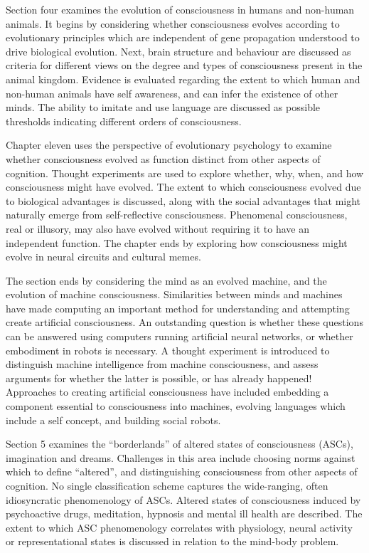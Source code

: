 \documentclass[a4paper]{article}
\begin{document}
Section four examines the evolution of consciousness in humans and non-human
animals. It begins by considering whether consciousness evolves according to
evolutionary principles which are independent of gene propagation understood
to drive biological evolution. Next, brain structure and behaviour are
discussed as criteria for different views on the degree and types of
consciousness present in the animal kingdom. Evidence is evaluated regarding
the extent to which human and non-human animals have self awareness, and can
infer the existence of other minds. The ability to imitate and use language
are discussed as possible thresholds indicating different orders of
consciousness.

Chapter eleven uses the perspective of evolutionary psychology to examine
whether consciousness evolved as function distinct from other aspects of
cognition. Thought experiments are used to explore whether, why, when, and how
consciousness might have evolved. The extent to which consciousness evolved
due to biological advantages is discussed, along with the social advantages
that might naturally emerge from self-reflective consciousness. Phenomenal
consciousness, real or illusory, may also have evolved without requiring it to
have an independent function. The chapter ends by exploring how consciousness
might evolve in neural circuits and cultural memes.

The section ends by considering the mind as an evolved machine, and the
evolution of machine consciousness. Similarities between minds and machines
have made computing an important method for  understanding and attempting
create artificial consciousness. An outstanding question is whether these
questions can be answered using computers running artificial neural networks,
or whether embodiment in robots is necessary. A thought experiment is
introduced to distinguish machine intelligence from machine consciousness, and
assess arguments for whether the latter is possible, or has already happened!
Approaches to creating artificial consciousness have included embedding a
component essential to consciousness into machines, evolving languages which
include a self concept, and building social robots.

Section 5 examines the ``borderlands'' of altered states of consciousness
(ASCs), imagination and dreams. Challenges in this area include choosing norms
against which to define ``altered'', and distinguishing consciousness from
other aspects of cognition. No single classification scheme captures the
wide-ranging, often idiosyncratic phenomenology of ASCs. Altered states of
consciousness induced by psychoactive drugs, meditation, hypnosis and mental
ill health are described. The extent to which ASC phenomenology correlates
with physiology, neural activity or representational states is discussed in
relation to the mind-body problem.
\end{document}
